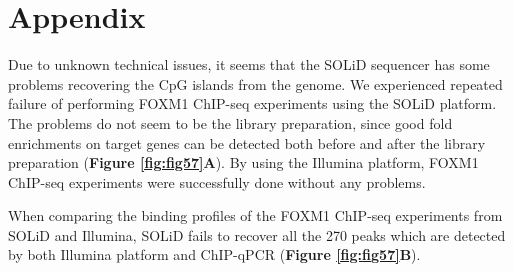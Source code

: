 \chapter[Appendix]{Appendix} \label{ch:appendix}

Due to unknown technical issues, it seems that the SOLiD sequencer has some problems recovering the CpG islands from the genome. We experienced repeated failure of performing FOXM1 ChIP-seq experiments using the SOLiD platform. The problems do not seem to be the library preparation, since good fold enrichments on target genes can be detected both before and after the library preparation (\textbf{Figure \ref{fig:fig57}A}). By using the Illumina platform, FOXM1 ChIP-seq experiments were successfully done without any problems.

When comparing the binding profiles of the FOXM1 ChIP-seq experiments from SOLiD and Illumina, SOLiD fails to recover all the 270 peaks which are detected by both Illumina platform and ChIP-qPCR (\textbf{Figure \ref{fig:fig57}B}).

